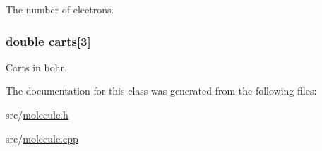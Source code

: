 The number of electrons. \hypertarget{classJKBuilder_1_1atom_a6b5adb6f3635311b52c7a7a35dcb01b4}{
\subsubsection[{carts}]{\setlength{\rightskip}{0pt plus 5cm}double {\bf carts}\mbox{[}3\mbox{]}}}
\label{classJKBuilder_1_1atom_a6b5adb6f3635311b52c7a7a35dcb01b4}


Carts in bohr. 

The documentation for this class was generated from the following files:\begin{DoxyCompactItemize}
\item 
src/\hyperlink{molecule_8h}{molecule.h}\item 
src/\hyperlink{molecule_8cpp}{molecule.cpp}\end{DoxyCompactItemize}
